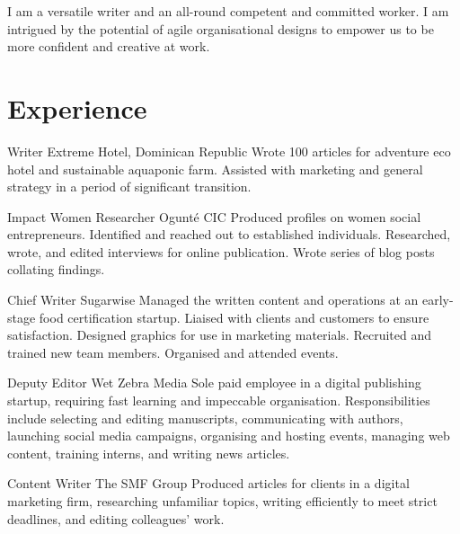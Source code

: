 \documentclass[DIV=15,color=blue!60!green!90]{komacv}
\begin{document}
  \rmfamily

  \maketitle

  \justify
  I am a versatile writer and an all-round competent and committed worker. I am
  intrigued by the potential of agile organisational designs to empower us
  to be more confident and creative at work.

  \raggedright


  \section{Experience}

  {Writer}
  {Extreme Hotel, Dominican Republic}
  {}
  {}
  {Wrote 100 articles for adventure eco hotel and sustainable aquaponic farm.
  Assisted with marketing and general strategy in a period of significant
  transition.}

  {Impact Women Researcher}
  {Ogunt\'e CIC}
  {}
  {}
  {Produced profiles on women social entrepreneurs. Identified and reached out
  to established individuals. Researched, wrote, and edited interviews for
  online publication. Wrote series of blog posts collating findings.}

  {Chief Writer}
  {Sugarwise}
  {}
  {}
  {Managed the written content and operations at an early-stage food
  certification startup. Liaised with clients and customers to ensure
  satisfaction. Designed graphics for use in marketing materials. Recruited and
  trained new team members. Organised and attended events.}

  {Deputy Editor}
  {Wet Zebra Media}
  {}
  {}
  {Sole paid employee in a digital publishing startup, requiring fast learning
  and impeccable organisation. Responsibilities include selecting and editing
  manuscripts, communicating with authors, launching social media campaigns,
  organising and hosting events, managing web content, training interns, and
  writing news articles.}

  {Content Writer}
  {The SMF Group}
  {}
  {}
  {Produced articles for clients in a digital marketing firm, researching
  unfamiliar topics, writing efficiently to meet strict deadlines, and editing
  colleagues' work.}
\end{document}
